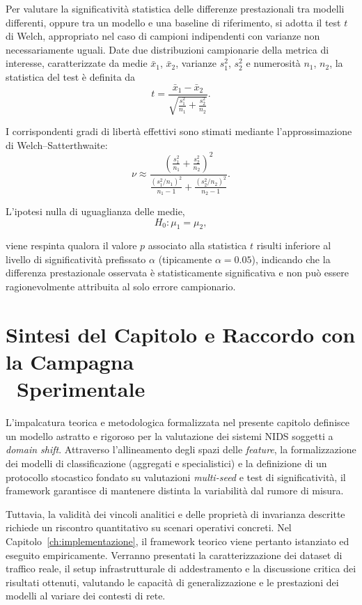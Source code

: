 Per valutare la significatività statistica delle differenze prestazionali tra modelli differenti, oppure tra un modello e una baseline di riferimento, si adotta il test $t$ di Welch, appropriato nel caso di campioni indipendenti con varianze non necessariamente uguali. Date due distribuzioni campionarie della metrica di interesse, caratterizzate da medie $\bar{x}_1$, $\bar{x}_2$, varianze $s_1^2$, $s_2^2$ e numerosità $n_1$, $n_2$, la statistica del test è definita da
\begin{equation}
    t=\frac{\bar{x}_1-\bar{x}_2}{\sqrt{\frac{s_1^2}{n_1}+\frac{s_2^2}{n_2}}}.
\end{equation}

I corrispondenti gradi di libertà effettivi sono stimati mediante l'approssimazione di Welch--Satterthwaite:
\begin{equation}
    \nu\approx\frac{\left(\frac{s_1^2}{n_1}+\frac{s_2^2}{n_2}\right)^2}{\frac{\left(s_1^2/n_1\right)^2}{n_1-1}+\frac{\left(s_2^2/n_2\right)^2}{n_2-1}}.
\end{equation}

L'ipotesi nulla di uguaglianza delle medie,
\[
    H_0:\mu_1=\mu_2,
\]

viene respinta qualora il valore $p$ associato alla statistica $t$ risulti inferiore al livello di significatività prefissato $\alpha$ (tipicamente $\alpha=0.05$), indicando che la differenza prestazionale osservata è statisticamente significativa e non può essere ragionevolmente attribuita al solo errore campionario.

\section[Sintesi del Capitolo e Raccordo con la Campagna Sperimentale]{Sintesi del Capitolo e Raccordo con la Campagna \\\ Sperimentale}
\label{sec:sintesi_raccordo_ch4}

L'impalcatura teorica e metodologica formalizzata nel presente capitolo definisce un modello astratto e rigoroso per la valutazione dei sistemi NIDS soggetti a \textit{domain shift}. 
Attraverso l'allineamento degli spazi delle \textit{feature}, la formalizzazione dei modelli di classificazione (aggregati e specialistici) e la definizione di un protocollo stocastico fondato su valutazioni \textit{multi-seed} e test di significatività, il framework garantisce di mantenere distinta la variabilità dal rumore di misura.

Tuttavia, la validità dei vincoli analitici e delle proprietà di invarianza descritte richiede un riscontro quantitativo su scenari operativi concreti. 
Nel Capitolo~\ref{ch:implementazione}, il framework teorico viene pertanto istanziato ed eseguito empiricamente. 
Verranno presentati la caratterizzazione dei dataset di traffico reale, il setup infrastrutturale di addestramento e la discussione critica dei risultati ottenuti, valutando le capacità di generalizzazione e le prestazioni dei modelli al variare dei contesti di rete.